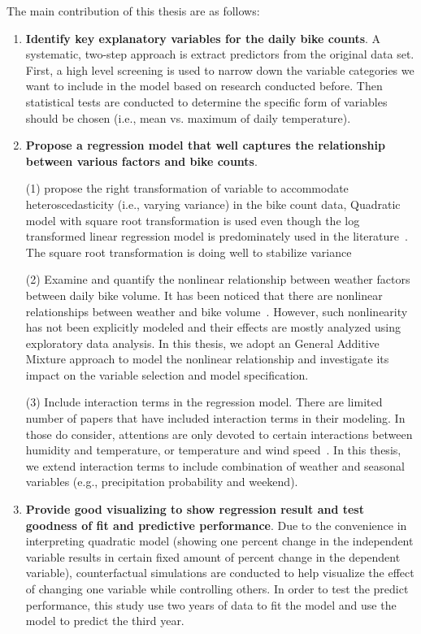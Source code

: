 \documentclass [11pt, proquest] {uwthesis}[2015/03/03]
\begin{document}
The main contribution of this thesis are as follows:
\begin{enumerate}
\item \textbf{Identify key explanatory variables for the daily bike counts}. A systematic, two-step approach is extract predictors from the original data set. First, a high level screening is used to narrow down the variable categories we want to include in the model based on research conducted before. Then statistical tests are conducted to determine the specific form of variables should be chosen (i.e., mean vs. maximum of daily temperature).
\item \textbf{Propose a regression model that well captures the relationship between various factors and bike counts}. 

(1) propose the right transformation of variable to accommodate heteroscedasticity (i.e., varying variance) in the bike count data, Quadratic model with square root transformation is used even though the log transformed linear regression model is predominately used in the literature~\cite{Nosal:2014aa,Thomas09,Ahmed12}. The square root transformation is doing well to stabilize variance 

(2) Examine and quantify the nonlinear relationship between weather factors between daily bike volume. It has been noticed that there are nonlinear relationships between weather and bike volume~\cite{Ahmed12,Miranda-Moreno:2011aa,Thomas12,Lewin:2011aa}. However, such nonlinearity has not been explicitly modeled and their effects are mostly analyzed using exploratory data analysis. In this thesis, we adopt an General Additive Mixture approach to model the nonlinear relationship and investigate its impact on the variable selection and model specification.

(3) Include interaction terms in the regression model. There are limited number of papers that have included interaction terms in their modeling. In those do consider, attentions are only devoted to certain interactions between humidity and temperature, or temperature and wind speed~\cite{Miranda-Moreno:2011aa}. In this thesis, we extend interaction terms to include combination of weather and seasonal variables (e.g., precipitation probability and weekend).

\item \textbf{Provide good visualizing to show regression result and test goodness of fit and predictive performance}. Due to the convenience in interpreting quadratic model (showing one percent change in the independent variable results in certain fixed amount of percent change in the dependent variable), counterfactual simulations are conducted to help visualize the effect of changing one variable while controlling others. In order to test the predict performance, this study use two years of data to fit the model and use the model to predict the third year. 



\end{enumerate}
\end{document}
